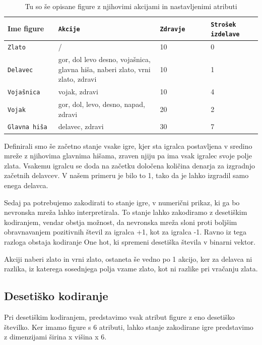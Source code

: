 \documentclass[a4paper, 12pt]{book}
\begin{document}
\begin{table}

	\begin{center}
		
	\begin{tabular}{p{0.2\linewidth}|p{0.4\linewidth}|p{0.2\linewidth}|p{0.2\linewidth}}
		Ime figure & {\tt Akcije} & {\tt Zdravje} & {\tt Strošek izdelave} \\ \hline
		{\tt Zlato} & / & 10 & 0 \\
		{\tt Delavec}   & gor, dol levo desno, vojašnica, glavna hiša, naberi zlato, vrni zlato, zdravi & 10  & 1 \\
		{\tt Vojašnica}   & vojak, zdravi & 10  & 4 \\
		{\tt Vojak}   & gor, dol, levo, desno, napad, zdravi  & 20 & 2 \\
		{\tt Glavna hiša}   & delavec, zdravi & 30  & 7 \\
	\end{tabular}
	\end{center}
	\caption{Tu so še opisane figure z njihovimi akcijami in nastavljenimi atributi}
	\label{tabelfigures}
\end{table}

Definirali smo še začetno stanje vsake igre, kjer sta igralca postavljena v sredino mreže z njihovima glavnima hišama, zraven njiju pa ima vsak igralec svoje polje zlata. Vsakemu igralcu se doda na začetku določena količina denarja za izgradnjo začetnih delavcev. V našem primeru je bilo to 1, tako da je lahko izgradil samo enega delavca.

Sedaj pa potrebujemo zakodirati to stanje igre, v numerični prikaz, ki ga bo nevronska mreža lahko interpretirala. To stanje lahko zakodiramo z desetiškim kodiranjem, vendar obstja možnost, da nevronska mreža sloni proti boljšim obravnavanjem pozitivnih števil za igralca +1, kot za igralca -1. Ravno iz tega razloga obstaja kodiranje One hot, ki spremeni desetiška števila v binarni vektor.

Akciji naberi zlato in vrni zlato, ostaneta še vedno po 1 akcijo, ker za delavca ni razlika, iz katerega sosednjega polja vzame zlato, kot ni razlike pri vračanju zlata.

\subsection{Desetiško kodiranje}
Pri desetiškim kodiranjem, predstavimo vsak atribut figure z eno desetiško številko.
Ker imamo figure s 6 atributi, lahko stanje zakodirane igre predstavimo z dimenzijami širina x višina x 6.
\end{document}
